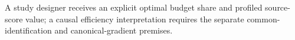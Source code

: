 A study designer receives an explicit optimal budget share and profiled source-score value; a causal efficiency interpretation requires the separate common-identification and canonical-gradient premises.